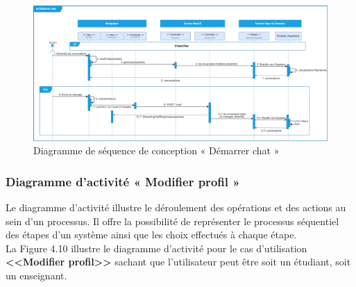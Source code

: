 \begin{itemize}[itemsep=1pt, parsep=1pt]
\begin{figure}[H]
        \includegraphics[width=1.25\textwidth,height=1.1\textwidth,angle=90]{images/chp4/fig9.png}
        \caption{Diagramme de séquence de conception « Démarrer chat »}
        \label{fig:Diagramme de séquence de conception « Démarrer chat »}    
    \end{figure}
\end{itemize}


\subsubsection{Diagramme d’activité « Modifier profil »}
\justifying
Le diagramme d'activité illustre le déroulement des opérations et des actions au sein d'un processus. Il offre la possibilité de représenter le processus séquentiel des étapes d'un système ainsi que les choix effectués à chaque étape. \\
La Figure 4.10 illustre le diagramme d’activité pour le cas d’utilisation \textbf{<<Modifier profil>>} sachant que l'utilisateur peut être soit un étudiant, soit un enseignant.\\

